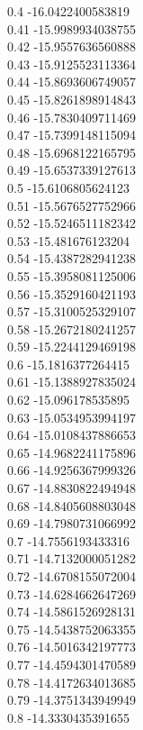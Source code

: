 {0.4	-16.0422400583819\\
0.41	-15.9989934038755\\
0.42	-15.9557636560888\\
0.43	-15.9125523113364\\
0.44	-15.8693606749057\\
0.45	-15.8261898914843\\
0.46	-15.7830409711469\\
0.47	-15.7399148115094\\
0.48	-15.6968122165795\\
0.49	-15.6537339127613\\
0.5	-15.6106805624123\\
0.51	-15.5676527752966\\
0.52	-15.5246511182342\\
0.53	-15.481676123204\\
0.54	-15.4387282941238\\
0.55	-15.3958081125006\\
0.56	-15.3529160421193\\
0.57	-15.3100525329107\\
0.58	-15.2672180241257\\
0.59	-15.2244129469198\\
0.6	-15.1816377264415\\
0.61	-15.1388927835024\\
0.62	-15.096178535895\\
0.63	-15.0534953994197\\
0.64	-15.0108437886653\\
0.65	-14.9682241175896\\
0.66	-14.9256367999326\\
0.67	-14.8830822494948\\
0.68	-14.8405608803048\\
0.69	-14.7980731066992\\
0.7	-14.7556193433316\\
0.71	-14.7132000051282\\
0.72	-14.6708155072004\\
0.73	-14.6284662647269\\
0.74	-14.5861526928131\\
0.75	-14.5438752063355\\
0.76	-14.5016342197773\\
0.77	-14.4594301470589\\
0.78	-14.4172634013685\\
0.79	-14.3751343949949\\
0.8	-14.3330435391655\\
}
